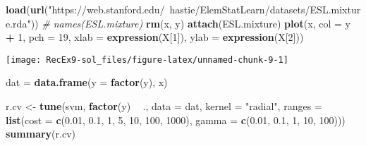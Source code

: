 \documentclass[]{article}
\newenvironment{Shaded}{\begin{snugshade}}{\end{snugshade}}
\newcommand{\CommentTok}[1]{\textcolor[rgb]{0.56,0.35,0.01}{\textit{#1}}}
\newcommand{\DataTypeTok}[1]{\textcolor[rgb]{0.13,0.29,0.53}{#1}}
\newcommand{\DecValTok}[1]{\textcolor[rgb]{0.00,0.00,0.81}{#1}}
\newcommand{\FloatTok}[1]{\textcolor[rgb]{0.00,0.00,0.81}{#1}}
\newcommand{\KeywordTok}[1]{\textcolor[rgb]{0.13,0.29,0.53}{\textbf{#1}}}
\newcommand{\NormalTok}[1]{#1}
\newcommand{\OperatorTok}[1]{\textcolor[rgb]{0.81,0.36,0.00}{\textbf{#1}}}
\newcommand{\StringTok}[1]{\textcolor[rgb]{0.31,0.60,0.02}{#1}}
\begin{document}
\begin{Shaded}
\begin{Highlighting}[]
\KeywordTok{load}\NormalTok{(}\KeywordTok{url}\NormalTok{(}\StringTok{"https://web.stanford.edu/~hastie/ElemStatLearn/datasets/ESL.mixture.rda"}\NormalTok{))}
\CommentTok{# names(ESL.mixture)}
\KeywordTok{rm}\NormalTok{(x, y)}
\KeywordTok{attach}\NormalTok{(ESL.mixture)}
\KeywordTok{plot}\NormalTok{(x, }\DataTypeTok{col =}\NormalTok{ y }\OperatorTok{+}\StringTok{ }\DecValTok{1}\NormalTok{, }\DataTypeTok{pch =} \DecValTok{19}\NormalTok{, }\DataTypeTok{xlab =} \KeywordTok{expression}\NormalTok{(X[}\DecValTok{1}\NormalTok{]), }\DataTypeTok{ylab =} \KeywordTok{expression}\NormalTok{(X[}\DecValTok{2}\NormalTok{]))}
\end{Highlighting}
\end{Shaded}

\texttt{[image: RecEx9-sol\_files/figure-latex/unnamed-chunk-9-1]}

\begin{Shaded}
\begin{Highlighting}[]
\NormalTok{dat =}\StringTok{ }\KeywordTok{data.frame}\NormalTok{(}\DataTypeTok{y =} \KeywordTok{factor}\NormalTok{(y), x)}
\end{Highlighting}
\end{Shaded}

\begin{Shaded}
\begin{Highlighting}[]
\NormalTok{r.cv <-}\StringTok{ }\KeywordTok{tune}\NormalTok{(svm, }\KeywordTok{factor}\NormalTok{(y) }\OperatorTok{~}\StringTok{ }\NormalTok{., }\DataTypeTok{data =}\NormalTok{ dat, }\DataTypeTok{kernel =} \StringTok{"radial"}\NormalTok{, }\DataTypeTok{ranges =} \KeywordTok{list}\NormalTok{(}\DataTypeTok{cost =} \KeywordTok{c}\NormalTok{(}\FloatTok{0.01}\NormalTok{, }
    \FloatTok{0.1}\NormalTok{, }\DecValTok{1}\NormalTok{, }\DecValTok{5}\NormalTok{, }\DecValTok{10}\NormalTok{, }\DecValTok{100}\NormalTok{, }\DecValTok{1000}\NormalTok{), }\DataTypeTok{gamma =} \KeywordTok{c}\NormalTok{(}\FloatTok{0.01}\NormalTok{, }\FloatTok{0.1}\NormalTok{, }\DecValTok{1}\NormalTok{, }\DecValTok{10}\NormalTok{, }\DecValTok{100}\NormalTok{)))}
\KeywordTok{summary}\NormalTok{(r.cv)}
\end{Highlighting}
\end{Shaded}
\end{document}
